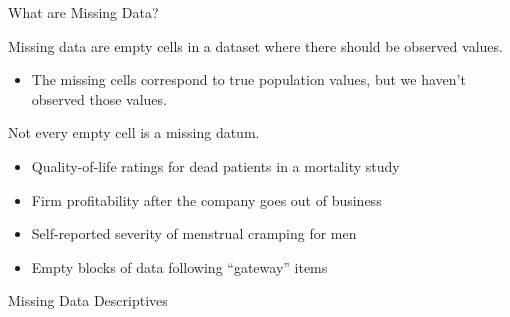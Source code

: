 \documentclass{beamer}\usepackage[]{graphicx}\usepackage[]{color}
\begin{document}

\begin{frame}{What are Missing Data?}
  
  Missing data are empty cells in a dataset where there should be observed 
  values.
  \vc
  \begin{itemize}
  \item The missing cells correspond to true population values, but we haven't 
    observed those values.
  \end{itemize}
  \vb 
  \pause
  Not every empty cell is a missing datum.
  \vc
  \begin{itemize}
  \item Quality-of-life ratings for dead patients in a mortality study
    \vc
  \item Firm profitability after the company goes out of business
    \vc
  \item Self-reported severity of menstrual cramping for men
    \vc
  \item Empty blocks of data following ``gateway'' items
  \end{itemize}
  
\end{frame}

    
\begin{frame}
  
  \begin{center}
    \huge{Missing Data Descriptives}
  \end{center}
  
\end{frame}

\end{document}
